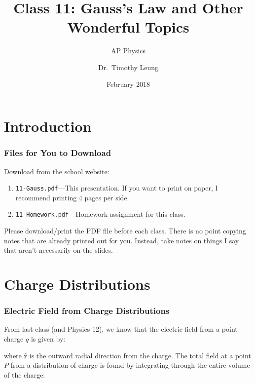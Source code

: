 \documentclass[12pt,aspectratio=169]{beamer}
\title{Class 11: Gauss's Law and Other Wonderful Topics}
\subtitle{AP Physics}
\author[TML]{Dr.\ Timothy Leung}
\institute{Olympiads School}
\date{February 2018}
\newcommand{\mb}[1]{\mathbf{#1}}
\newcommand{\eq}[2]{\vspace{#1}{\Large\begin{displaymath}#2\end{displaymath}}}
\begin{document}
\begin{frame}
  \maketitle
\end{frame}


\section[Intro]{Introduction}

\begin{frame}
  \frametitle{Files for You to Download}
  Download from the school website:
  \begin{enumerate}
  \item\texttt{11-Gauss.pdf}---This presentation. If you want to print on
    paper, I recommend printing 4 pages per side.
  \item\texttt{11-Homework.pdf}---Homework assignment for this class.
  \end{enumerate}

  \vspace{.2in}Please download/print the PDF file before each class. There is
  no point copying notes that are already printed out for you. Instead, take
  notes on things I say that aren't necessarily on the slides.
\end{frame}



\section{Charge Distributions}

\begin{frame}
  \frametitle{Electric Field from Charge Distributions}

  From last class (and Physics 12), we know that the electric field from a
  point charge $q$ is given by:

  \eq{-.2in}{\mb{E}=\frac{kq}{r^2}\hat{\mb{r}}}
  
  where $\hat{\mb{r}}$ is the outward radial direction from the charge. The
  total field at a point $P$ from a distribution of charge is found by
  integrating through the entire volume of the charge:

  \eq{-.2in}{\boxed{\mb{E}=\int_V\frac{kdq}{r^2}\hat{\mb{r}}}}
\end{frame}
\end{document}
